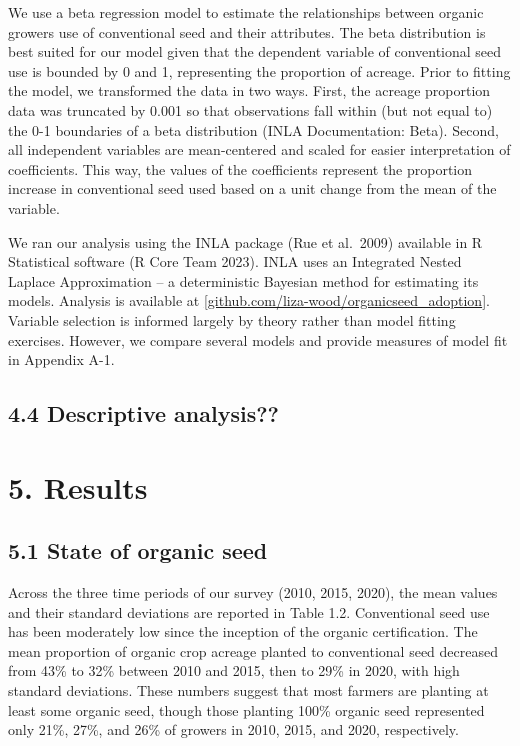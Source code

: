 \documentclass[twoside,12pt,final]{ucthesis-CA2012}
\begin{document}
\begin{ucmainmatter}
We use a beta regression model to estimate the relationships between
organic growers\textquotesingle{} use of conventional seed and their attributes. The
beta distribution is best suited for our model given that the dependent
variable of conventional seed use is bounded by 0 and 1, representing
the proportion of acreage. Prior to fitting the model, we transformed
the data in two ways. First, the acreage proportion data was truncated
by 0.001 so that observations fall within (but not equal to) the 0-1
boundaries of a beta distribution (INLA Documentation: Beta). Second,
all independent variables are mean-centered and scaled for easier
interpretation of coefficients. This way, the values of the coefficients
represent the proportion increase in conventional seed used based on a
unit change from the mean of the variable.

We ran our analysis using the INLA package (Rue et al.~2009) available
in R Statistical software (R Core Team 2023). INLA uses an Integrated
Nested Laplace Approximation -- a deterministic Bayesian method for
estimating its models. Analysis is available at
\href{https://github.com/liza-wood/organicseed_adoption}{{[}github.com/liza-wood/organicseed\_adoption{]}}.
Variable selection is informed largely by theory rather than model
fitting exercises. However, we compare several models and provide
measures of model fit in Appendix A-1.

\hypertarget{descriptive-analysis}{%
\subsection{4.4 Descriptive analysis??}\label{descriptive-analysis}}

\hypertarget{results}{%
\section{5. Results}\label{results}}

\hypertarget{state-of-organic-seed}{%
\subsection{5.1 State of organic seed}\label{state-of-organic-seed}}

Across the three time periods of our survey (2010, 2015, 2020), the mean
values and their standard deviations are reported in Table 1.2.
Conventional seed use has been moderately low since the inception of the
organic certification. The mean proportion of organic crop acreage
planted to conventional seed decreased from 43\% to 32\% between 2010 and
2015, then to 29\% in 2020, with high standard deviations. These numbers
suggest that most farmers are planting at least some organic seed,
though those planting 100\% organic seed represented only 21\%, 27\%, and
26\% of growers in 2010, 2015, and 2020, respectively.


\end{ucmainmatter}
\end{document}
